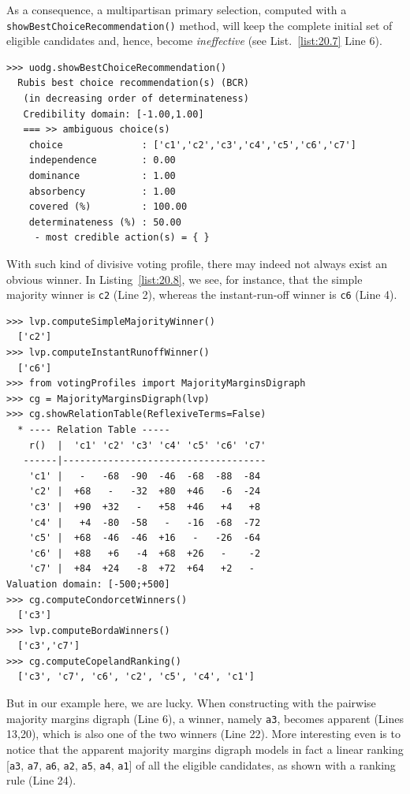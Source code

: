 As a consequence, a multipartisan primary selection, computed with a \texttt{show\-Best\-ChoiceRecommendation()} method,  will keep the complete initial set of eligible candidates and, hence, become \emph{ineffective} (see List.~\vref{list:20.7} Line 6).
\begin{lstlisting}[caption={Example of ineffective primary multipartisan selection},label=list:20.7]
>>> uodg.showBestChoiceRecommendation()
  Rubis best choice recommendation(s) (BCR)
   (in decreasing order of determinateness)   
   Credibility domain: [-1.00,1.00]
   === >> ambiguous choice(s)
    choice              : ['c1','c2','c3','c4','c5','c6','c7']
    independence        : 0.00
    dominance           : 1.00
    absorbency          : 1.00
    covered (%)         : 100.00
    determinateness (%) : 50.00
     - most credible action(s) = { }
\end{lstlisting}

With such kind of divisive voting profile, there may indeed not always exist an obvious winner. In Listing~\vref{list:20.8}, we see, for instance, that the simple majority winner is \texttt{c2} (Line 2), whereas the instant-run-off winner is \texttt{c6} (Line 4).
\begin{lstlisting}[caption={Example of non obvious secondary selection},label=list:20.8]
>>> lvp.computeSimpleMajorityWinner()
  ['c2']
>>> lvp.computeInstantRunoffWinner()
  ['c6']
>>> from votingProfiles import MajorityMarginsDigraph
>>> cg = MajorityMarginsDigraph(lvp)
>>> cg.showRelationTable(ReflexiveTerms=False)
  * ---- Relation Table -----
    r()  |  'c1' 'c2' 'c3' 'c4' 'c5' 'c6' 'c7'	  
   ------|------------------------------------
    'c1' |   -   -68  -90  -46  -68  -88  -84	 
    'c2' |  +68   -   -32  +80  +46   -6  -24	 
    'c3' |  +90  +32   -   +58  +46   +4   +8	 
    'c4' |   +4  -80  -58   -   -16  -68  -72	 
    'c5' |  +68  -46  -46  +16	 -   -26  -64	 
    'c6' |  +88   +6   -4  +68	+26   -    -2	 
    'c7' |  +84  +24   -8  +72	+64   +2   - 	 
Valuation domain: [-500;+500]
>>> cg.computeCondorcetWinners()
  ['c3']
>>> lvp.computeBordaWinners()
  ['c3','c7']
>>> cg.computeCopelandRanking()
  ['c3', 'c7', 'c6', 'c2', 'c5', 'c4', 'c1']
\end{lstlisting}

But in our example here, we are lucky. When constructing with the pairwise majority margins digraph (Line 6), a \Condorcet winner, namely \texttt{a3}, becomes apparent (Lines 13,20), which is also one of the two \Borda winners (Line 22). More interesting even is to notice that the apparent majority margins digraph models in fact a linear ranking [\texttt{a3}, \texttt{a7}, \texttt{a6}, \texttt{a2}, \texttt{a5}, \texttt{a4}, \texttt{a1}] of all the eligible candidates, as shown with a \Copeland ranking rule (Line 24).

